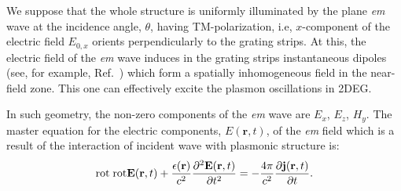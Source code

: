 \documentclass[%
 reprint,
 amsmath,amssymb,
 aps,
]{revtex4-2}
\begin{document}
We suppose that the whole structure is uniformly illuminated by the plane \textit{em} wave at the incidence angle, $\theta$, having TM-polarization, i.e, $x$-component of the electric field $E_{0,x}$ orients perpendicularly to the grating strips. At this, the electric field of the \textit{em} wave induces in the grating strips instantaneous dipoles (see, for example, Ref.~\cite{Kor2014}) which form a spatially inhomogeneous field in the near-field zone. This one can effectively excite the plasmon oscillations in 2DEG.

In such geometry, the non-zero components of the \textit{em} wave are $E_x$, $E_z$, $H_y$. The master equation for the electric components, $E(\textbf{r}, t)$, of the \textit{em} field which is a result of the interaction of incident wave with plasmonic structure is:
\begin{align} \label{Maxwell}
  \textrm{rot}\;\textrm{rot}{\bf E}(\textbf{r},t)+\frac{\epsilon({\textbf{r}})}{c^2}\frac{\partial^{2} {\bf E}(\textbf{r},t)}{\partial t^{2}}=-\frac{4\pi}{c^2}\frac{\partial {\bf j}(\textbf{r},t)}{\partial t}.
\end{align}
\end{document}
